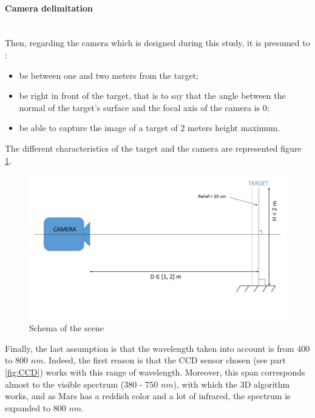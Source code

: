 \paragraph*{Camera delimitation}
~\\
Then, regarding the camera which is designed during this study, it is presumed to :
\begin{itemize}
\item be between one and two meters from the target;
\item be right in front of the target, that is to say that the angle between the normal of the target's surface and the focal axis of the camera is 0\textdegree;
\item be able to capture the image of a target of 2 meters height maximum.
\end{itemize}

The different characteristics of the target and the camera are represented figure \ref{fig:schema system}.


\begin{figure}[h]
  \centerline{\includegraphics[scale=0.4]{fig/schemaSystem.jpg}}
  \caption{Schema of the scene}
  \label{fig:schema system}
\end{figure}

Finally, the last assumption is that the wavelength taken into account is from 400 to 800 $nm$. Indeed, the first reason is that the CCD sensor chosen (see part \ref{fig:CCD}) works with this range of wavelength. Moreover, this span corresponds almost to the visible spectrum (380 - 750 $nm$), with which the 3D algorithm works, and as Mars has a reddish color and a lot of infrared, the spectrum is expanded to 800 $nm$.
